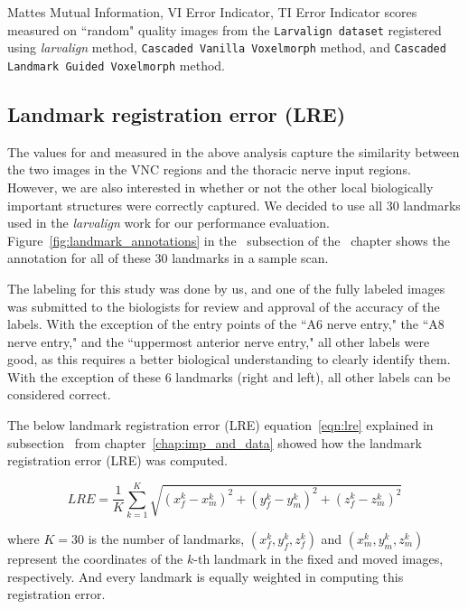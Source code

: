 \documentclass{book}
\begin{document}
	\begin{table}[h!]
		\centering
		
		\caption{Mattes Mutual Information, VI Error Indicator, TI Error Indicator scores measured on ``random" quality images from the \texttt{Larvalign dataset} registered using \emph{larvalign} method, \texttt{Cascaded Vanilla Voxelmorph} method, and \texttt{Cascaded Landmark Guided Voxelmorph} method.}
		\label{table:Quality_Random_Fresh}
	\end{table}

	\subsection{Landmark registration error (LRE)} \label{subsec:landmark_distance}
	The values for  and  measured in the above analysis capture the similarity between the two images in the VNC regions and the thoracic nerve input regions. However, we are also interested in whether or not the other local biologically important structures were correctly captured. We decided to use all 30 landmarks used in the \emph{larvalign} work for our performance evaluation. Figure~\ref{fig:landmark_annotations} in the~ subsection of the~ chapter shows the annotation for all of these 30 landmarks in a sample scan. 
	
	The labeling for this study was done by us, and one of the fully labeled images was submitted to the biologists for review and approval of the accuracy of the labels. With the exception of the entry points of the ``A6 nerve entry," the ``A8 nerve entry," and the ``uppermost anterior nerve entry," all other labels were good, as this requires a better biological understanding to clearly identify them. With the exception of these 6 landmarks (right and left), all other labels can be considered correct.
	
	The below landmark registration error (LRE) equation~\eqref{eqn:lre} explained in subsection~ from chapter~\ref{chap:imp_and_data} showed how the landmark registration error (LRE) was computed.
	
	$$ LRE = \frac{1}{K} \sum_{k=1}^K \sqrt{(x_f^k - x_m^k)^2 + (y_f^k - y_m^k)^2 + (z_f^k - z_m^k)^2} $$
	
	where $K=30$ is the number of landmarks, $(x_f^k, y_f^k, z_f^k)$ and $(x_m^k, y_m^k, z_m^k)$ represent the coordinates of the $k$-th landmark in the fixed and moved images, respectively. And every landmark is equally weighted in computing this registration error.
	
\end{document}
